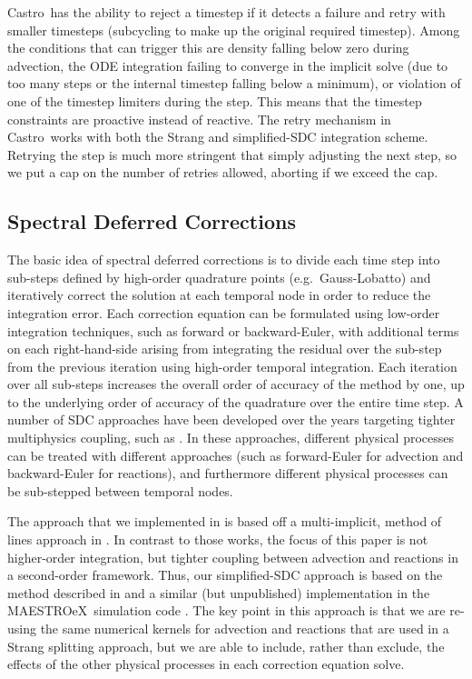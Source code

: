 \documentclass[linenumbers,trackchanges]{aastex631}
\newcommand{\castro}{{\sf Castro}}
\newcommand{\maestroex}{{\sf MAESTROeX}}
\newcommand{\MarginPar}[1]{\marginpar{\vskip-\baselineskip\raggedright\tiny\sffamily\hrule\smallskip{\color{red}#1}\par\smallskip\hrule}}
\begin{document}
\castro\ has the ability to reject a timestep if it detects a failure and retry
with smaller timesteps (subcycling to make up the original required timestep).
Among the conditions that can trigger this are density falling below zero during
advection, the ODE integration failing to converge in the implicit solve (due to
too many steps or the internal timestep falling below a minimum), or violation
of one of the timestep limiters during the step.  This means that the timestep
constraints are proactive instead of reactive.  The retry mechanism in \castro\
works with both the Strang and simplified-SDC integration scheme.  Retrying the
step is much more stringent that simply adjusting the next step, so we put a cap
on the number of retries allowed, aborting if we exceed the cap. 



\subsection{Spectral Deferred Corrections}

The basic idea of spectral deferred corrections \citep{dutt:2000} is to divide each time step into sub-steps defined by high-order quadrature points (e.g.~Gauss-Lobatto) and iteratively correct the solution at each temporal node in order to reduce the integration error.
Each correction equation can be formulated using low-order integration techniques, such as forward or backward-Euler, with additional terms on each right-hand-side arising from integrating the residual over the sub-step from the previous iteration using high-order temporal integration.
Each iteration over all sub-steps increases the overall order of accuracy of the method by one, up to the underlying order of accuracy of the quadrature over the entire time step.
A number of SDC approaches have been developed
over the years targeting tighter multiphysics coupling, such as 
\cite{bourlioux2003high,SDC-old}.  In these approaches, different physical processes can be treated with different approaches (such as forward-Euler for advection and backward-Euler for reactions), and furthermore different physical processes can be sub-stepped between temporal nodes.

The approach that we implemented in \citet{castro_sdc} is based off a
multi-implicit, method of lines approach in \citet{bourlioux2003high}.
In contrast to those works, the focus of this paper is not higher-order integration, but tighter coupling
between advection and reactions in a second-order framework.
Thus, our simplified-SDC approach is based on the method described in \citet{SDC-old}
and a similar (but unpublished) implementation in the \maestroex\ simulation
code \citep{maestroex}.
The key point in this approach is that we are re-using the same numerical kernels 
for advection and reactions that are used in a Strang splitting approach,
but we are able to include, rather than exclude, the effects of the other 
physical processes in each correction equation solve.
\end{document}
